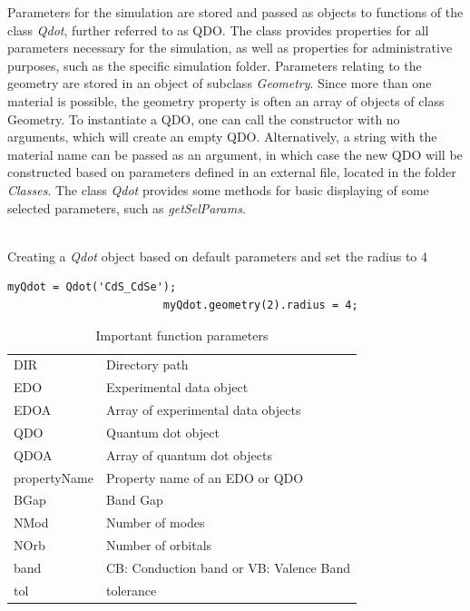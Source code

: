 				Parameters for the simulation are stored and passed as objects to functions of the class \textit{Qdot}, further referred to as \gls{QDO}. 
				The class provides properties for all parameters necessary for the simulation, as well as properties for administrative purposes, such as the 
				specific simulation folder. Parameters relating to the geometry are stored in an object of subclass \textit{Geometry}. Since more than one material 
				is possible, the geometry property is often an array of objects of class Geometry. 
				To instantiate a \gls{QDO}, one can call the constructor with no arguments, which will create an empty \gls{QDO}. Alternatively, a string with the material 
				name can be passed as an argument, in which case the new \gls{QDO} will be constructed based on parameters defined in an external file, located 
				in the folder \textit{Classes}.
				The class \textit{Qdot} provides some methods for basic displaying of some selected parameters, such as \textit{getSelParams}.\\\\
				\begin{EXAMPLE}
					Creating a \textit{Qdot} object based on default parameters and set the radius to 4
					\begin{lstlisting}[frame=none]
						myQdot = Qdot('CdS_CdSe');
						myQdot.geometry(2).radius = 4;
					\end{lstlisting}
				\end{EXAMPLE}
	
				\begin{table}[htbp]
					\centering
					\begin{tabular}{ll}
						DIR						&	Directory path														\\
						EDO						& Experimental data object									\\
						EDOA					& Array of experimental data objects				\\
						QDO						& Quantum dot object												\\
						QDOA					&	Array of quantum dot objects							\\
						propertyName	& Property name of an EDO or QDO						\\
						BGap					& Band Gap																	\\
						NMod					& Number of modes														\\
						NOrb					& Number of orbitals												\\
						band					& CB: Conduction band or VB: Valence Band		\\
						tol						& tolerance																	\\
					\end{tabular}
					\caption{Important function parameters}
					\label{tbl:functionParmeters}
				\end{table}
				
